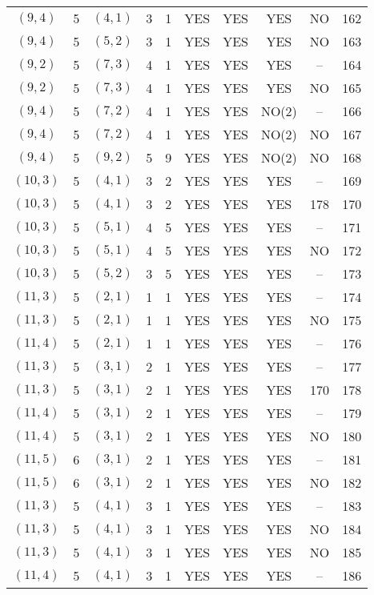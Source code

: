 \begin{longtable}{|c|c|c|c|c|c|c|c|c|c|}
$(9, 4)$ & 5 & $(4, 1)$ & 3 & 1 & YES & YES & YES & NO & 162\\
$(9, 4)$ & 5 & $(5, 2)$ & 3 & 1 & YES & YES & YES & NO & 163\\
$(9, 2)$ & 5 & $(7, 3)$ & 4 & 1 & YES & YES & YES & -- & 164\\
$(9, 2)$ & 5 & $(7, 3)$ & 4 & 1 & YES & YES & YES & NO & 165\\
$(9, 4)$ & 5 & $(7, 2)$ & 4 & 1 & YES & YES & NO(2) & -- & 166\\
$(9, 4)$ & 5 & $(7, 2)$ & 4 & 1 & YES & YES & NO(2) & NO & 167\\
$(9, 4)$ & 5 & $(9, 2)$ & 5 & 9 & YES & YES & NO(2) & NO & 168\\
$(10, 3)$ & 5 & $(4, 1)$ & 3 & 2 & YES & YES & YES & -- & 169\\
$(10, 3)$ & 5 & $(4, 1)$ & 3 & 2 & YES & YES & YES & 178 & 170\\
$(10, 3)$ & 5 & $(5, 1)$ & 4 & 5 & YES & YES & YES & -- & 171\\
$(10, 3)$ & 5 & $(5, 1)$ & 4 & 5 & YES & YES & YES & NO & 172\\
$(10, 3)$ & 5 & $(5, 2)$ & 3 & 5 & YES & YES & YES & -- & 173\\
$(11, 3)$ & 5 & $(2, 1)$ & 1 & 1 & YES & YES & YES & -- & 174\\
$(11, 3)$ & 5 & $(2, 1)$ & 1 & 1 & YES & YES & YES & NO & 175\\
$(11, 4)$ & 5 & $(2, 1)$ & 1 & 1 & YES & YES & YES & -- & 176\\
$(11, 3)$ & 5 & $(3, 1)$ & 2 & 1 & YES & YES & YES & -- & 177\\
$(11, 3)$ & 5 & $(3, 1)$ & 2 & 1 & YES & YES & YES & 170 & 178\\
$(11, 4)$ & 5 & $(3, 1)$ & 2 & 1 & YES & YES & YES & -- & 179\\
$(11, 4)$ & 5 & $(3, 1)$ & 2 & 1 & YES & YES & YES & NO & 180\\
$(11, 5)$ & 6 & $(3, 1)$ & 2 & 1 & YES & YES & YES & -- & 181\\
$(11, 5)$ & 6 & $(3, 1)$ & 2 & 1 & YES & YES & YES & NO & 182\\
$(11, 3)$ & 5 & $(4, 1)$ & 3 & 1 & YES & YES & YES & -- & 183\\
$(11, 3)$ & 5 & $(4, 1)$ & 3 & 1 & YES & YES & YES & NO & 184\\
$(11, 3)$ & 5 & $(4, 1)$ & 3 & 1 & YES & YES & YES & NO & 185\\
$(11, 4)$ & 5 & $(4, 1)$ & 3 & 1 & YES & YES & YES & -- & 186\\

\end{longtable}
